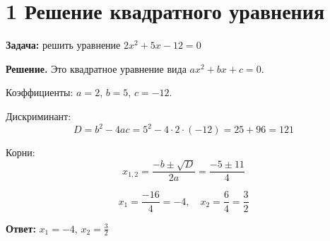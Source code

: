 \documentclass{article}
\begin{document}
\section*{1 Решение квадратного уравнения}

\textbf{Задача:} решить уравнение \(2x^2 + 5x - 12 = 0\)

\textbf{Решение.} Это квадратное уравнение вида \(ax^2 + bx + c = 0\).

Коэффициенты: \(a = 2\), \(b = 5\), \(c = -12\).

Дискриминант: 
\[D = b^2 - 4ac = 5^2 - 4 \cdot 2 \cdot (-12) = 25 + 96 = 121\]

Корни:
\[x_{1,2} = \frac{-b \pm \sqrt{D}}{2a} = \frac{-5 \pm 11}{4}\]

\[x_1 = \frac{-16}{4} = -4,\quad x_2 = \frac{6}{4} = \frac{3}{2}\]

\textbf{Ответ:} \(x_1 = -4\), \(x_2 = \frac{3}{2}\)
\end{document}
